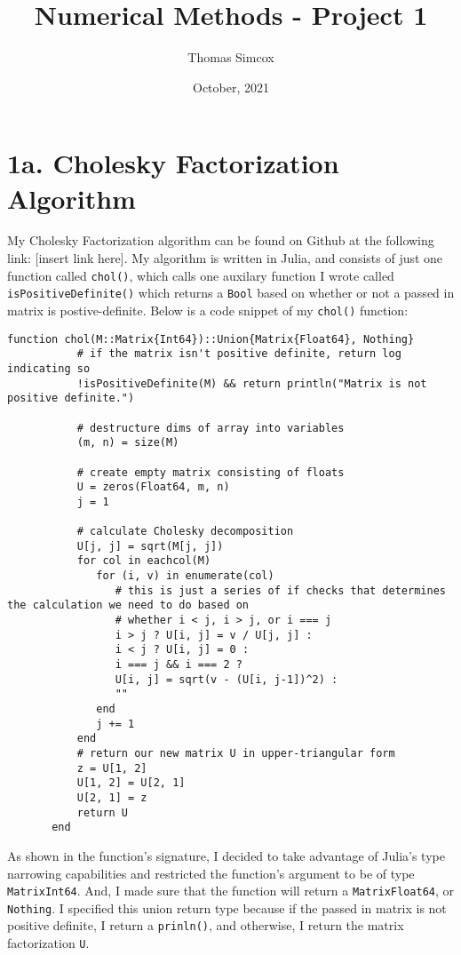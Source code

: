 \documentclass{article}
\title{Numerical Methods - Project 1}
\author{Thomas Simcox}
\date{October, 2021}
\begin{document}
    \maketitle

    \section*{1a. Cholesky Factorization Algorithm}
    My Cholesky Factorization algorithm can be found on Github at the following link: [insert link here].\bigbreak
    My algorithm is written in Julia, and consists of just one function called \texttt{chol()}, which calls one auxilary
    function I wrote called \texttt{isPositiveDefinite()} which returns a \texttt{Bool} based on whether or not a passed in matrix 
    is postive-definite. Below is a code snippet of my \texttt{chol()} function:
    \begin{Verbatim}[fontsize=\small,xleftmargin=0cm]
        function chol(M::Matrix{Int64})::Union{Matrix{Float64}, Nothing}
           # if the matrix isn't positive definite, return log indicating so
           !isPositiveDefinite(M) && return println("Matrix is not positive definite.")
          
           # destructure dims of array into variables
           (m, n) = size(M)
           
           # create empty matrix consisting of floats
           U = zeros(Float64, m, n)
           j = 1
          
           # calculate Cholesky decomposition
           U[j, j] = sqrt(M[j, j])
           for col in eachcol(M)
              for (i, v) in enumerate(col)
                 # this is just a series of if checks that determines the calculation we need to do based on
                 # whether i < j, i > j, or i === j
                 i > j ? U[i, j] = v / U[j, j] :
                 i < j ? U[i, j] = 0 :
                 i === j && i === 2 ?
                 U[i, j] = sqrt(v - (U[i, j-1])^2) :
                 ""
              end
              j += 1
           end
           # return our new matrix U in upper-triangular form
           z = U[1, 2]
           U[1, 2] = U[2, 1]
           U[2, 1] = z
           return U
       end
    \end{Verbatim}

    As shown in the function's signature, I decided to take advantage of Julia's type narrowing capabilities and restricted the 
    function's argument to be of type \texttt{Matrix{Int64}}. And, I made sure that the function will return a \texttt{Matrix{Float64}}, or \texttt{Nothing}.
    I specified this union return type because if the passed in matrix is not positive definite, I return a \texttt{prinln()}, and otherwise,
    I return the matrix factorization \texttt{U}.
\end{document}
